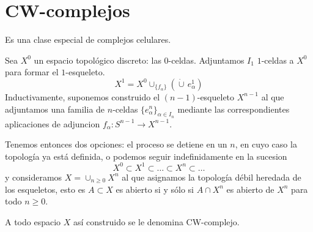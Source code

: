 \section{CW-complejos}
Es una clase especial de complejos celulares. \par
Sea $X^0$ un espacio topológico discreto: las $0$-celdas. Adjuntamos $I_1$ $1$-celdas a $X^0$ para formar el $1$-esqueleto.
\[ X^1 = X^0 \cup_{\{f_\alpha\}} \left( \dot{\cup} \, e_\alpha^1 \right) \]
Inductivamente, suponemos construido el $(n-1)$-esqueleto $X^{n-1}$ al que adjuntamos una familia de $n$-celdas $\{e_\alpha^n\}_{\alpha \in I_n}$ mediante las correspondientes aplicaciones de adjuncion $f_\alpha : S^{n-1} \longrightarrow X^{n-1}$. \par 
Tenemos entonces dos opciones: el proceso se detiene en un $n$, en cuyo caso la topología ya está definida, o podemos seguir indefinidamente en la sucesion
\[ X^0 \subset X^1 \subset \ldots \subset X^n \subset \ldots \]
y consideramos $ \displaystyle X = \cup_{n \geq 0} X^n $ al que asignamos la topología débil heredada de los esqueletos, esto es $A \subset X$ es abierto si y sólo si $A \cap X^n$ es abierto de $X^n$ para todo $n \geq 0$. \par 
A todo espacio $X$ así construido se le denomina CW-complejo.
